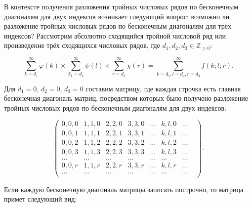 
В контексте получения разложения тройных числовых рядов по бесконечным диагоналям для двух индексов возникает следующий вопрос: возможно ли разложение тройных числовых рядов по бесконечным диагоналям для трёх индексов? Рассмотрим абсолютно сходящийся тройной числовой ряд или произведение трёх сходящихся числовых рядов, где $d_1, d_2, d_3\in\mathbb{Z}_{\ge 0}$:

$$\sum_{k=d_1}^\infty \varphi (k)\times

\sum_{k_1=d_2}^\infty \psi (l)\times

\sum_{r=d_3}^\infty \chi(r)=

\sum_{k=d_1,l=d_2,r=d_3}^\infty f(k;l;r).$$

Для $d_1=0$, $d_2=0$, $d_3=0$ составим матрицу, где каждая строчка есть главная бесконечная диагональ матриц, посредством которых было получено разложение тройных числовых рядов по бесконечным диагоналям для двух индексов:

$$

\begin{pmatrix}

{0}, {0}, {0}&{1}, {1}, {0}&{2}, {2}, {0}&{3}, {3}, {0}&\ldots &{k}, {l}, {0}&\ldots\\

{0}, {0}, {1}&{1}, {1}, {1}&{2}, {2}, {1}&{3}, {3}, {1}&\ldots &{k}, {l}, {1}&\ldots\\

{0}, {0}, {2}&{1}, {1}, {2}&{2}, {2}, {2}&{3}, {3}, {2}&\ldots &{k}, {l}, {2}&\ldots\\

{0}, {0}, {3}&{1}, {1}, {3}&{2}, {2}, {3}&{3}, {3}, {3}&\ldots &{k}, {l}, {3}&\ldots\\

\ldots &\ldots &\ldots &\ldots &\ldots &\ldots &\ldots &\\

{0}, {0}, {r}&{1}, {1}, {r}&{2}, {2}, {r}&{3}, {3}, {r}&\ldots &{k}, {l}, {r}&\ldots\\

\ldots &\ldots &\ldots &\ldots &\ldots &\ldots &\ldots &\\

\end{pmatrix}.

$$

Если каждую бесконечную диагональ матрицы записать построчно, то матрица примет следующий вид:


